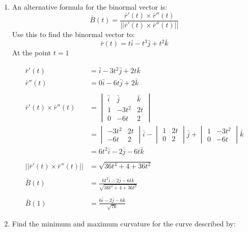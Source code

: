 \documentclass[a4paper,11pt]{article}
\begin{document}
\begin{preview}
\begin{enumerate}
\begin{enumerate}
        
        \item An alternative formula for the binormal vector is:
        $$ \bar{B}(t) = \frac{\bar{r}'(t) \times \bar{r}''(t)}{|| \bar{r}'(t) \times \bar{r}''(t) ||} $$
        Use this to find the binormal vector to:
        $$ \bar{r}(t) = t\bar{i} -t^3\bar{j} + t^2\bar{k} $$
        At the point $t = 1$

        \begin{align*}
            \bar{r}'(t) &= \bar{i} - 3t^2\bar{j} + 2t\bar{k}\\
            \bar{r}''(t) &= 0\bar{i} - 6t\bar{j} + 2\bar{k}\\\\
            \bar{r}'(t) \times \bar{r}''(t) &=  
            \begin{vmatrix}
                \bar{i} & \bar{j} & \bar{k}\\
                1 & -3t^2 & 2t \\
                0 & -6t & 2
            \end{vmatrix}\\
            &= \begin{vmatrix}
                -3t^2 & 2t \\
                -6t & 2
            \end{vmatrix} \bar{i}
            -\begin{vmatrix}
                1 & 2t\\
                0 & 2
            \end{vmatrix} \bar{j}
            +  \begin{vmatrix}
                1 & -3t^2\\
                0 & -6t
            \end{vmatrix}\bar{k}\\
            &=6t^2\bar{i} - 2\bar{j} - 6t\bar{k} \\\\
            || \bar{r}'(t) \times \bar{r}''(t) || &= \sqrt{36t^4 + 4 + 36t^2}\\\\
            \bar{B}(t) &= \frac{6t^2\bar{i} - 2\bar{j} - 6t\bar{k}}{\sqrt{36t^4 + 4 + 36t^2}}\\\\
            \bar{B}(1) &= \frac{6\bar{i} - 2\bar{j} - 6\bar{k}}{\sqrt{76}}
        \end{align*}

        \item Find the minimum and maximum curvature for the curve described by:
        


\end{enumerate}
\end{enumerate}
\end{preview}
\end{document}
